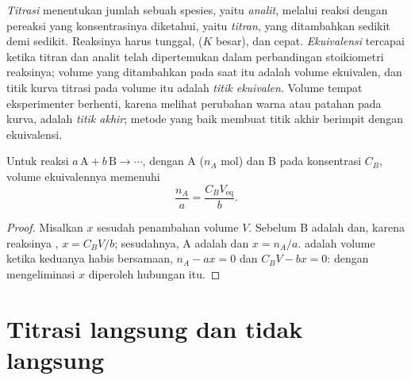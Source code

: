 \begin{definition}\label{def:b1:titration-methods:titration}
\emph{Titrasi} menentukan jumlah sebuah spesies, yaitu
\emph{analit}, melalui reaksi dengan pereaksi yang
konsentrasinya diketahui, yaitu \emph{titran}, yang
ditambahkan sedikit demi sedikit. Reaksinya harus tunggal, 
($K$ besar), dan cepat. \emph{Ekuivalensi} tercapai
ketika titran dan analit telah dipertemukan dalam perbandingan
stoikiometri reaksinya; volume yang ditambahkan pada saat itu adalah
volume ekuivalen, dan titik kurva titrasi pada volume itu adalah
\emph{titik ekuivalen}. Volume tempat
eksperimenter berhenti, karena melihat perubahan warna atau patahan
pada kurva, adalah \emph{titik akhir}; metode yang
baik membuat titik akhir berimpit dengan ekuivalensi.
\end{definition}

\begin{proposition}\label{prop:b1:titration-methods:equivalence}
Untuk reaksi  $a\,\mathrm{A} + b\,\mathrm{B} \to \cdots$, dengan
 A ($n_A$ mol) dan  B pada konsentrasi $C_B$, volume
ekuivalennya memenuhi
\[
  \frac{n_A}{a} = \frac{C_B V_{\mathrm{eq}}}{b} .
\]
\end{proposition}

\begin{proof}
Misalkan $x$  sesudah penambahan volume  $V$.
Sebelum  B adalah  dan, karena reaksinya
, $x = C_BV/b$; sesudahnya, A adalah  dan
$x = n_A/a$.  adalah volume ketika keduanya habis bersamaan,
$n_A - ax = 0$ dan $C_BV - bx = 0$: dengan mengeliminasi $x$ diperoleh
hubungan itu.
\end{proof}

\section{Titrasi langsung dan tidak langsung}

